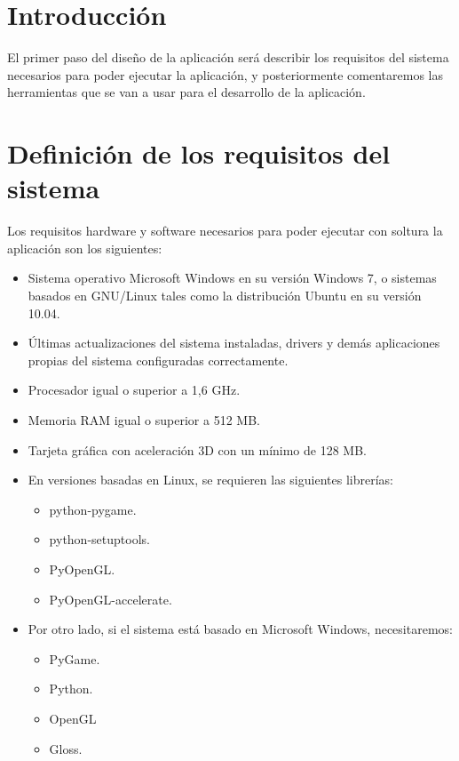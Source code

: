

\section{Introducción}

El primer paso del diseño de la aplicación será describir los requisitos del
sistema necesarios para poder ejecutar la aplicación, y posteriormente comentaremos las herramientas que se
van a usar para el desarrollo de la aplicación.

\section{Definición de los requisitos del sistema}

Los requisitos hardware y software necesarios para poder ejecutar con soltura la aplicación son los siguientes:

\begin{itemize}
	\item Sistema operativo Microsoft Windows en su versión Windows 7, o sistemas basados en GNU/Linux tales como
		la distribución Ubuntu en su versión 10.04.
	\item Últimas actualizaciones del sistema instaladas, drivers y demás aplicaciones propias del sistema
		configuradas correctamente.
	\item Procesador igual o superior a 1,6 GHz.
	\item Memoria RAM igual o superior a 512 MB.
	\item Tarjeta gráfica con aceleración 3D con un mínimo de 128 MB.
	\item En versiones basadas en Linux, se requieren las siguientes librerías:
		\begin{itemize}
			\item python-pygame.
			\item python-setuptools.
			\item PyOpenGL.
			\item PyOpenGL-accelerate.
		\end{itemize}
	\item Por otro lado, si el sistema está basado en Microsoft Windows, necesitaremos:
		\begin{itemize}
			\item PyGame.
			\item Python.
            \item OpenGL
            \item Gloss.
		\end{itemize}
\end{itemize}

